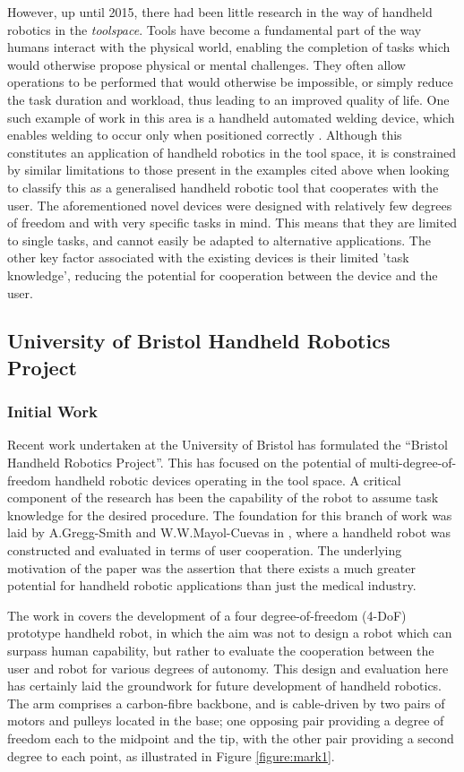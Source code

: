 \documentclass[11pt]{article}
\begin{document}
However, up until 2015, there had been little research in the way of handheld robotics in the \textit{toolspace}. Tools have become a fundamental part of the way humans interact with the physical world, enabling the completion of tasks which would otherwise propose physical or mental challenges. They often allow operations to be performed that would otherwise be impossible, or simply reduce the task duration and workload, thus leading to an improved quality of life. One such example of work in this area is a handheld automated welding device, which enables welding to occur only when positioned correctly \cite{Echtler2004}. Although this constitutes an application of handheld robotics in the tool space, it is constrained by similar limitations to those present in the examples cited above when looking to classify this as a generalised handheld robotic tool that cooperates with the user. The aforementioned novel devices were designed with relatively few degrees of freedom and with very specific tasks in mind. This means that they are limited to single tasks, and cannot easily be adapted to alternative applications. The other key factor associated with the existing devices is their limited 'task knowledge', reducing the potential for cooperation between the device and the user.

\subsection{University of Bristol Handheld Robotics Project} \label{bristolhandheld}
\subsubsection{Initial Work}
Recent work undertaken at the University of Bristol has formulated the “Bristol Handheld Robotics Project”. This has focused on the potential of multi-degree-of-freedom handheld robotic devices operating in the tool space. A critical component of the research has been the capability of the robot to assume task knowledge for the desired procedure. The foundation for this branch of work was laid by A.Gregg-Smith and W.W.Mayol-Cuevas in \cite{GreggSmithDesign}, where a handheld robot was constructed and evaluated in terms of user cooperation. The underlying motivation of the paper was the assertion that there exists a much greater potential for handheld robotic applications than just the medical industry.

The work in \cite{GreggSmithDesign} covers the development of a four degree-of-freedom (4-DoF) prototype handheld robot, in which the aim was not to design a robot which can surpass human capability, but rather to evaluate the cooperation between the user and robot for various degrees of autonomy. This design and evaluation here has certainly laid the groundwork for future development of handheld robotics. The arm comprises a carbon-fibre backbone, and is cable-driven by two pairs of motors and pulleys located in the base; one opposing pair providing a degree of freedom each to the midpoint and the tip, with the other pair providing a second degree to each point, as illustrated in Figure \ref{figure:mark1}.
\end{document}
